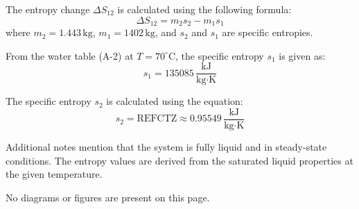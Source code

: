 The entropy change \( \Delta S_{12} \) is calculated using the following formula:  
\[
\Delta S_{12} = m_2 s_2 - m_1 s_1
\]  
where \( m_2 = 1.443 \, \text{kg} \), \( m_1 = 1402 \, \text{kg} \), and \( s_2 \) and \( s_1 \) are specific entropies.  

From the water table (A-2) at \( T = 70^\circ\text{C} \), the specific entropy \( s_1 \) is given as:  
\[
s_1 = 135085 \, \frac{\text{kJ}}{\text{kg·K}}
\]  

The specific entropy \( s_2 \) is calculated using the equation:  
\[
s_2 = \text{REFCTZ} \approx 0.95549 \, \frac{\text{kJ}}{\text{kg·K}}
\]  

Additional notes mention that the system is fully liquid and in steady-state conditions. The entropy values are derived from the saturated liquid properties at the given temperature.  

No diagrams or figures are present on this page.